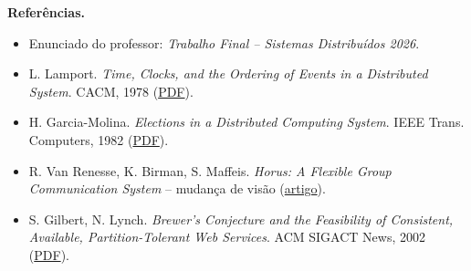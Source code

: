 \documentclass[10pt,a4paper]{article}
\begin{document}
\textbf{Referências.}
\begin{itemize}
\item Enunciado do professor: \emph{Trabalho Final -- Sistemas Distribuídos 2026}.
\item L. Lamport. \emph{Time, Clocks, and the Ordering of Events in a Distributed System}. CACM, 1978 (\href{https://lamport.azurewebsites.net/pubs/time-clocks.pdf}{PDF}).
\item H. Garcia-Molina. \emph{Elections in a Distributed Computing System}. IEEE Trans. Computers, 1982 (\href{https://homepage.cs.uiowa.edu/~ghosh/Bully.pdf}{PDF}).
\item R. Van Renesse, K. Birman, S. Maffeis. \emph{Horus: A Flexible Group Communication System} -- mudança de visão (\href{https://www.cs.cornell.edu/home/rvr/papers/podc/node7.html}{artigo}).
\item S. Gilbert, N. Lynch. \emph{Brewer's Conjecture and the Feasibility of Consistent, Available, Partition-Tolerant Web Services}. ACM SIGACT News, 2002 (\href{https://groups.csail.mit.edu/tds/papers/Gilbert/Brewer2.pdf}{PDF}).
\end{itemize}
\end{document}
